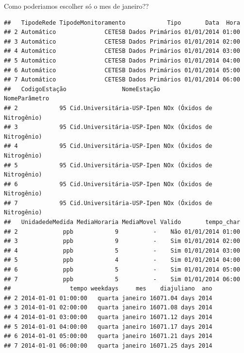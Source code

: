 \documentclass[]{book}
\newenvironment{Shaded}{\begin{snugshade}}{\end{snugshade}}
\newcommand{\KeywordTok}[1]{\textcolor[rgb]{0.13,0.29,0.53}{\textbf{#1}}}
\newcommand{\StringTok}[1]{\textcolor[rgb]{0.31,0.60,0.02}{#1}}
\newcommand{\CommentTok}[1]{\textcolor[rgb]{0.56,0.35,0.01}{\textit{#1}}}
\newcommand{\OperatorTok}[1]{\textcolor[rgb]{0.81,0.36,0.00}{\textbf{#1}}}
\newcommand{\NormalTok}[1]{#1}
\begin{document}
Como poderiamos escolher só o mes de janeiro??

\begin{Shaded}
\end{Shaded}

\begin{verbatim}
##   TipodeRede TipodeMonitoramento            Tipo       Data  Hora
## 2 Automático              CETESB Dados Primários 01/01/2014 01:00
## 3 Automático              CETESB Dados Primários 01/01/2014 02:00
## 4 Automático              CETESB Dados Primários 01/01/2014 03:00
## 5 Automático              CETESB Dados Primários 01/01/2014 04:00
## 6 Automático              CETESB Dados Primários 01/01/2014 05:00
## 7 Automático              CETESB Dados Primários 01/01/2014 06:00
##   CodigoEstação                NomeEstação              NomeParâmetro
## 2            95 Cid.Universitária-USP-Ipen NOx (Óxidos de Nitrogênio)
## 3            95 Cid.Universitária-USP-Ipen NOx (Óxidos de Nitrogênio)
## 4            95 Cid.Universitária-USP-Ipen NOx (Óxidos de Nitrogênio)
## 5            95 Cid.Universitária-USP-Ipen NOx (Óxidos de Nitrogênio)
## 6            95 Cid.Universitária-USP-Ipen NOx (Óxidos de Nitrogênio)
## 7            95 Cid.Universitária-USP-Ipen NOx (Óxidos de Nitrogênio)
##   UnidadedeMedida MediaHoraria MediaMovel Valido       tempo_char
## 2             ppb            9          -    Não 01/01/2014 01:00
## 3             ppb            9          -    Sim 01/01/2014 02:00
## 4             ppb            5          -    Sim 01/01/2014 03:00
## 5             ppb            4          -    Sim 01/01/2014 04:00
## 6             ppb            5          -    Sim 01/01/2014 05:00
## 7             ppb            5          -    Sim 01/01/2014 06:00
##                 tempo weekdays     mes    diajuliano  ano
## 2 2014-01-01 01:00:00   quarta janeiro 16071.04 days 2014
## 3 2014-01-01 02:00:00   quarta janeiro 16071.08 days 2014
## 4 2014-01-01 03:00:00   quarta janeiro 16071.12 days 2014
## 5 2014-01-01 04:00:00   quarta janeiro 16071.17 days 2014
## 6 2014-01-01 05:00:00   quarta janeiro 16071.21 days 2014
## 7 2014-01-01 06:00:00   quarta janeiro 16071.25 days 2014
\end{verbatim}
\end{document}
